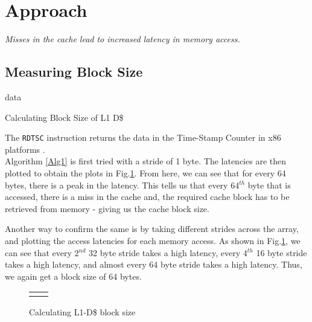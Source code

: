 \documentclass[12pt,a4paper,english]{paper}
\newenvironment{results}{%
  \def\FrameCommand{%
    \hspace{1pt}%
    {\color{blue}\vrule width 2pt}%
    {\color{formalblue}\vrule width 4pt}%
    \colorbox{formalblue}%
  }%
  \MakeFramed{\advance\hsize-\width\FrameRestore}%
  \noindent\hspace{-4.55pt}%
  \begin{adjustwidth}{7pt}{}%
  \vspace{2pt}\vspace{2pt}%
}
{%
  \vspace{2pt}\end{adjustwidth}\endMakeFramed%
}
\begin{document}
\section{Approach}
\begin{results}
    \textsl{Misses in the cache lead to increased latency in memory access.}
\end{results}

\subsection{Measuring Block Size}
\begin{algorithm}[H]
\SetAlgoLined
{}
 
     \plot data\;
 \caption{Calculating Block Size of L1 D\$}
    \label{Alg1}
\end{algorithm}

The \texttt{RDTSC} instruction returns the data in the Time-Stamp Counter in x86 platforms \cite{intel_2021}.\\

Algorithm \ref{Alg1} is first tried with a stride of 1 byte. The latencies are then plotted to obtain the plots in Fig.\ref{Fig:blockSize}. From here, we can see that for every 64 bytes, there is a peak in the latency. This tells us that every 64$^{th}$ byte that is accessed, there is a miss in the cache and, the required cache block has to be retrieved from memory - giving us the cache block size.

Another way to confirm the same is by taking different strides across the array, and plotting the access latencies for each memory access. As shown in Fig.\ref{Fig:blockSize}, we can see that every 2$^{nd}$ 32 byte stride takes a high latency, every 4$^{th}$ 16 byte stride takes a high latency, and almost every 64 byte stride takes a high latency. Thus, we again get a block size of 64 bytes.

\begin{figure}[H]
    \centering
    \setlength\tabcolsep{1pt}
    \begin{tabular}{cc}
        \def\svgwidth{0.5\columnwidth}
        &
        \def\svgwidth{0.5\columnwidth}
        
    \end{tabular}
    \caption{Calculating L1-D\$ block size}
    \label{Fig:blockSize}
\end{figure}
\end{document}
